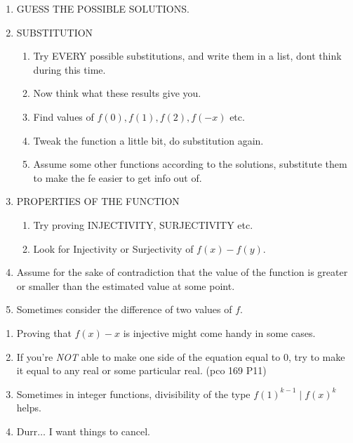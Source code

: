 \begin{take_note*}[title={Can't Start? Try These}]{}
    \begin{enumerate}[wide=0em, label=\arabic*, itemsep=10pt, parsep=5pt, font=\bfseries]
        \item GUESS THE POSSIBLE SOLUTIONS.

        \item SUBSTITUTION 
            \begin{enumerate}
                \item Try EVERY possible substitutions, and write them in a
                    list, dont think during this time.
                \item Now think what these results give you.
                \item Find values of $ f(0), f(1), f(2), f(-x) $ etc.
                \item Tweak the function a little bit, do substitution again.
                \item Assume some other functions according to the solutions,
                    substitute them to make the fe easier to get info out of.
            \end{enumerate}

        \item PROPERTIES OF THE FUNCTION
            \begin{enumerate}
                \item Try proving INJECTIVITY, SURJECTIVITY etc.
                \item Look for Injectivity or Surjectivity of $ f(x)-f(y) $.
            \end{enumerate}

        \item Assume for the sake of contradiction that the value of the
            function is greater or smaller than the estimated value at some
            point.

        \item Sometimes consider the difference of two values of $ f $.
    \end{enumerate}
\end{take_note*}

\begin{take_note*}{}
    \begin{enumerate}[wide=0em, label=\arabic*, itemsep=10pt, parsep=5pt, font=\bfseries]
        \item Proving that $f(x)-x$ is injective might come handy in some cases.
        \item If you're \emph{NOT} able to make one side of the equation equal
            to $0$, try to make it equal to any real or some particular real.
            (pco 169 P11)
        \item Sometimes in integer functions, divisibility of the type
            $f(1)^{k-1}\mid f(x)^k$ helps.	
        \item Durr$\dots$ I want things to cancel. 
    \end{enumerate}
\end{take_note*}


